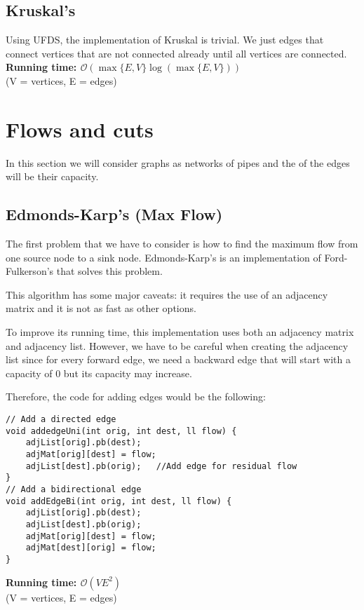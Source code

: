 \subsection{Kruskal's}
Using UFDS, the implementation of Kruskal is trivial. We just edges that connect 
vertices that are not connected already until all vertices are connected.
\noindent \textbf{\boldmath Running time: $\mathcal{O}(\max\{E,V\}\log(\max\{E,V\}) )$}
\\ {\small (V = vertices, E = edges)}

\newpage
\section{Flows and cuts}
In this section we will consider graphs as networks of pipes and the 
of the edges will be their capacity.

\subsection{Edmonds-Karp's (Max Flow)}
The first problem that we have to consider is how to find the maximum flow from one
source node to a sink node. Edmonds-Karp's is an implementation of Ford-Fulkerson's 
that solves this problem.

This algorithm has some major caveats: it requires the use of an adjacency matrix
and it is not as fast as other options.

To improve its running time, this implementation uses both an adjacency matrix 
and adjacency list. However, we have to be careful when creating the adjacency
list since for every forward edge, we need a backward edge that will start with 
a capacity of 0 but its capacity may increase. 

Therefore, the code for adding edges would be the following:
\begin{verbatim}
// Add a directed edge
void addedgeUni(int orig, int dest, ll flow) {
    adjList[orig].pb(dest);
    adjMat[orig][dest] = flow;
    adjList[dest].pb(orig);   //Add edge for residual flow
}
// Add a bidirectional edge
void addEdgeBi(int orig, int dest, ll flow) {
    adjList[orig].pb(dest);
    adjList[dest].pb(orig);
    adjMat[orig][dest] = flow;
    adjMat[dest][orig] = flow;
}
\end{verbatim}
\newpage
{}
\noindent \textbf{\boldmath Running time: $\mathcal{O}(VE^2)$}
\\ {\small (V = vertices, E = edges)}
